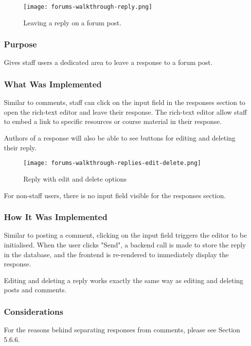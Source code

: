 \begin{figure}[h!]
    \texttt{[image: forums-walkthrough-reply.png]}
    \centering
    \caption{Leaving a reply on a forum post.}
\end{figure}

\subsubsection{Purpose}
Gives staff users a dedicated area to leave a response to a forum post.

\subsubsection{What Was Implemented}
Similar to comments, staff can click on the input field in the responses section to open the rich-text editor and leave their response.
The rich-text editor allow staff to embed a link to specific resources or course material in their response.

\newpage

Authors of a response will also be able to see buttons for editing and deleting their reply.

\begin{figure}[h!]
    \texttt{[image: forums-walkthrough-replies-edit-delete.png]}
    \centering
    \caption{Reply with edit and delete options}
\end{figure}

For non-staff users, there is no input field visible for the responses section.

\subsubsection{How It Was Implemented}
Similar to posting a comment, clicking on the input field triggers the editor to be initialised.
When the user clicks "Send", a backend call is made to store the reply in the database, and the frontend is re-rendered to immediately display the response.

Editing and deleting a reply works exactly the same way as editing and deleting posts and comments.

\subsubsection{Considerations}
For the reasons behind separating responses from comments, please see Section 5.6.6.

